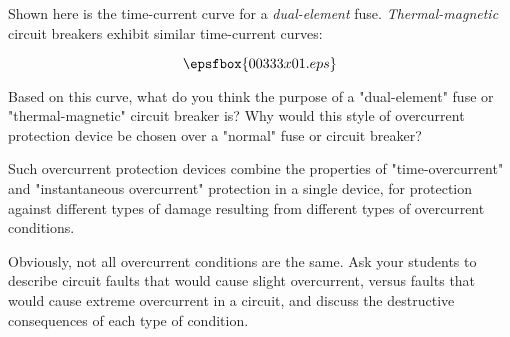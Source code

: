 

Shown here is the time-current curve for a {\it dual-element} fuse.  {\it Thermal-magnetic} circuit breakers exhibit similar time-current curves:

$$\epsfbox{00333x01.eps}$$

Based on this curve, what do you think the purpose of a "dual-element" fuse or "thermal-magnetic" circuit breaker is?  Why would this style of overcurrent protection device be chosen over a "normal" fuse or circuit breaker?







Such overcurrent protection devices combine the properties of "time-overcurrent" and "instantaneous overcurrent" protection in a single device, for protection against different types of damage resulting from different types of overcurrent conditions.







Obviously, not all overcurrent conditions are the same.  Ask your students to describe circuit faults that would cause slight overcurrent, versus faults that would cause extreme overcurrent in a circuit, and discuss the destructive consequences of each type of condition.




